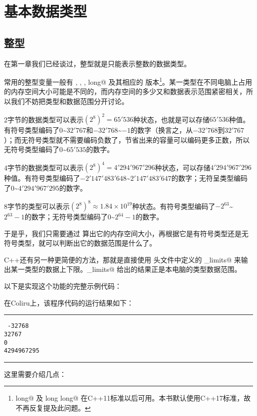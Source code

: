 \section{基本数据类型}
\subsection*{整型}
在第一章我们已经谈过，整型就是只能表示整数的数据类型。\par
常用的整型变量一般有 \lstinline@short@, \lstinline@int@, \lstinline@long@, \lstinline@long long@ 及其相应的 \lstinline@unsigned@ 版本\footnote{\lstinline@long long@ 及 \lstinline@unsigned long long@ 在C++11标准以后可用。本书默认使用C++17标准，故不再反复提及此问题。}。某一类型在不同电脑上占用的内存空间大小可能是不同的，而内存空间的多少又和数据表示范围紧密相关，所以我们不妨把类型和数据范围分开讨论。\par
2字节的数据类型可以表示$(2^8)^2=65'536$种状态，也就是可以存储$65'536$种值。有符号类型编码了$0$\~{}$32'767$和$-32'768$\~{}$-1$的数字（换言之，从$-32'768$到$32'767$）；而无符号类型就不需要编码负数了，节省出来的容量可以编码更多正数，所以无符号类型编码了$0$\~{}$65'535$的数字。\par
4字节的数据类型可以表示$(2^8)^4=4'294'967'296$种状态，可以存储$4'294'967'296$种值。有符号类型编码了$-2'147'483'648$\~{}$2'147'483'647$的数字；无符呈类型编码了$0$\~{}$4'294'967'295$的数字。\par
8字节的类型可以表示$(2^8)^8\approx1.84\times10^{19}$种状态。有符号类型编码了$-2^{63}$\~{}$2^{63}-1$的数字；无符号类型编码了$0$\~{}$2^{64}-1$的数字。\par
于是乎，我们只需要通过 \lstinline@sizeof@ 算出它的内存空间大小，再根据它是有符号类型还是无符号类型，就可以判断出它的数据范围是什么了。\par
C++还有另一种更简便的方法，那就是直接使用 \lstinline@limits@ 头文件中定义的 \lstinline@numeric_limits@ 来输出某一类型的数据上下限。\lstinline@numeric_limits@ 给出的结果正是本电脑的类型数据范围。\par
以下是实现这个功能的完整示例代码：

在Coliru上，该程序代码的运行结果如下：\\\noindent\rule{\textwidth}{.2pt}\texttt{
-32768\\
32767\\
0\\
4294967295
}\\\noindent\rule{\textwidth}{.2pt}\par
这里需要介绍几点：\par
